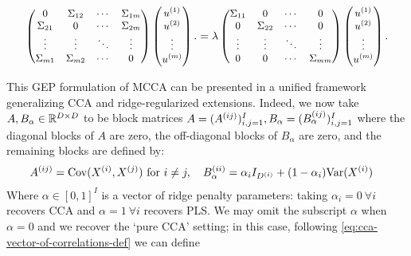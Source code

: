 \begin{align}
    \small
    \begin{pmatrix}
        0           & \Sigma_{12} & \cdots & \Sigma_{1m} \\
        \Sigma_{21} & 0           & \cdots & \Sigma_{2m} \\
        \vdots      & \vdots      & \ddots & \vdots      \\
        \Sigma_{m1} & \Sigma_{m2} & \cdots & 0
    \end{pmatrix}
    \begin{pmatrix}
        u^{(1)} \\
        u^{(2)} \\
        \vdots   \\
        u^{(m)}
    \end{pmatrix}.
    =
    \lambda
    \begin{pmatrix}
        \Sigma_{11} & 0           & \cdots & 0           \\
        0           & \Sigma_{22} & \cdots & 0           \\
        \vdots      & \vdots      & \ddots & \vdots      \\
        0           & 0           & \cdots & \Sigma_{mm}
    \end{pmatrix}
    \begin{pmatrix}
        u^{(1)} \\
        u^{(2)} \\
        \vdots   \\
        u^{(m)}
    \end{pmatrix}.
\end{align}

This GEP formulation of MCCA can be presented in a unified framework generalizing CCA and ridge-regularized extensions. Indeed, we now take $A,B_\alpha \in \mathbb{R}^{D \times D}$ to be block matrices $A = (A^{(ij)})_{i,j=1}^I, B_\alpha = (B_\alpha^{(ij)})_{i,j=1}^I$ where the diagonal blocks of $A$ are zero, the off-diagonal blocks of $B_\alpha$ are zero, and the remaining blocks are defined by:
\begin{align}
    \label{eq:gep-most-general-formulation}%
    A^{(ij)} &= \Cov(X\sps{i}, X\sps{j}) \text{ for } i \neq j, \quad %
    B_\alpha^{(ii)} = \alpha_i I_{D\sps{i}} + (1-\alpha_i) \Var(X\sps{i})  %
\end{align}
Where $\alpha \in [0,1]^I$ is a vector of ridge penalty parameters: taking $\alpha_i = 0 \: \forall i$ recovers CCA and $\alpha = 1 \: \forall i$ recovers PLS.
We may omit the subscript $\alpha$ when $\alpha=0$ and we recover the `pure CCA' setting; in this case, following \ref{eq:cca-vector-of-correlations-def} we can define

